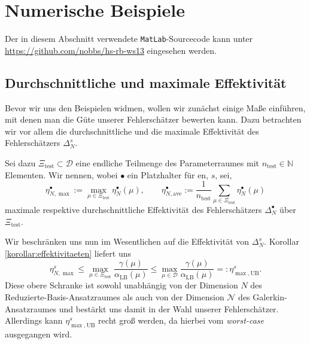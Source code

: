 
\section{Numerische Beispiele} %
\label{sec:beispiel}

Der in diesem Abschnitt verwendete \texttt{MatLab}-Sourcecode kann unter \url{https://github.com/nobbs/hs-rb-ws13} eingesehen werden.

\subsection{Durchschnittliche und maximale Effektivität} %
\label{sub:durchschnittliche_und_maximale_effektivitaet}

Bevor wir uns den Beispielen widmen, wollen wir zunächst einige Maße einführen, mit denen man die Güte unserer Fehlerschätzer bewerten kann.
Dazu betrachten wir vor allem die durchschnittliche und die maximale Effektivität des Fehlerschätzers $\Delta^s_N$.

Sei dazu $\Xi_{\text{test}} \subset \mathcal D$ eine endliche Teilmenge des Parameterraumes mit $n_\text{test} \in \mathbb{N}$ Elementen.
Wir nennen, wobei $\bullet$ ein Platzhalter für \glqq{}$\text{en}$\grqq{}, \glqq{}$s$\grqq{}, \glqq{} \grqq{} sei,
\begin{equation}
    \eta^\bullet_{N,\max} := \max_{\mu \in \Xi_\text{test}} \eta^\bullet_N(\mu), \qquad
    \eta^\bullet_{N,\text{ave}} := \frac{1}{n_\text{test}} \sum_{\mu \in \Xi_\text{test}} \eta^\bullet_N(\mu)
\end{equation}
maximale respektive durchschnittliche Effektivität des Fehlerschätzers $\Delta^\bullet_N$ über $\Xi_\text{test}$.

Wir beschränken uns nun im Wesentlichen auf die Effektivität von $\Delta^s_N$. Korollar \ref{korollar:effektivitaeten} liefert uns
\begin{equation}
    \eta^s_{N,\max} \leq \max_{\mu \in \Xi_\text{test}} \frac{\gamma(\mu)}{\alpha_{\text{LB}}(\mu)} \leq \max_{\mu \in \mathcal D} \frac{\gamma(\mu)}{\alpha_{\text{LB}}(\mu)} =: \eta^s_{\max,\text{UB}}.
\end{equation}
Diese obere Schranke ist sowohl unabhängig von der Dimension $N$ des Reduzierte-Basis-Ansatzraumes als auch von der Dimension $\mathcal N$ des Galerkin-Ansatzraumes und bestärkt uns damit in der Wahl unserer Fehlerschätzer. Allerdings kann $\eta^s_{\max,\text{UB}}$ recht groß werden, da hierbei vom \emph{worst-case} ausgegangen wird.


